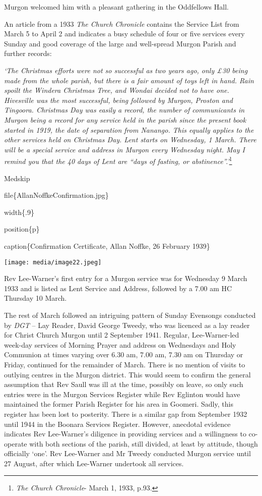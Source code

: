 Murgon welcomed him with a pleasant gathering in the Oddfellows Hall.

An article from a 1933 \emph{The Church Chronicle} contains the Service List from March 5 to April 2 and indicates a busy schedule of four or five services every Sunday and good coverage of the large and well-spread Murgon Parish and further records:

\emph{`The Christmas efforts were not so successful as two years ago, only £30 being made from the whole parish, but there is a fair amount of toys left in hand. Rain spoilt the Windera Christmas Tree, and Wondai decided not to have one. Hivesville was the most successful, being followed by Murgon, Proston and Tingoora. Christmas Day was easily a record, the number of communicants in Murgon being a record for any service held in the parish since the present book started in 1919, the date of separation from Nanango. This equally applies to the other services held on Christmas Day. Lent starts on Wednesday, 1 March. There will be a special service and address in Murgon every Wednesday night. May I remind you that the 40 days of Lent are ``days of fasting, or abstinence''.'}\footnote{\emph{The Church Chronicle}- March 1, 1933, p.93.}

Medskip

file\{AllanNoffkeConfirmation.jpg\}

width\{.9\}

position\{p\}

caption\{Confirmation Certificate, Allan Noffke, 26 February 1939\}

\texttt{[image: media/image22.jpeg]}

Rev Lee-Warner's first entry for a Murgon service was for Wednesday 9 March 1933 and is listed as Lent Service and Address\emph{,} followed by a 7.00 am HC Thursday 10 March.

The rest of March followed an intriguing pattern of Sunday Evensongs conducted by \emph{DGT} -- Lay Reader, David George Tweedy, who was licenced as a lay reader for Christ Church Murgon until 2 September 1941. Regular, Lee-Warner-led week-day services of Morning Prayer and address on Wednesdays and Holy Communion at times varying over 6.30 am, 7.00 am, 7.30 am on Thursday or Friday, continued for the remainder of March. There is no mention of visits to outlying centres in the Murgon district. This would seem to confirm the general assumption that Rev Saull was ill at the time, possibly on leave, so only such entries were in the Murgon Services Register while Rev Eglinton would have maintained the former Parish Register for his area in Goomeri. Sadly, this register has been lost to posterity. There is a similar gap from September 1932 until 1944 in the Boonara Services Register. However, anecdotal evidence indicates Rev Lee-Warner's diligence in providing services and a willingness to co-operate with both sections of the parish, still divided, at least by attitude, though officially `one'. Rev Lee-Warner and Mr Tweedy conducted Murgon service until 27 August, after which Lee-Warner undertook all services.


